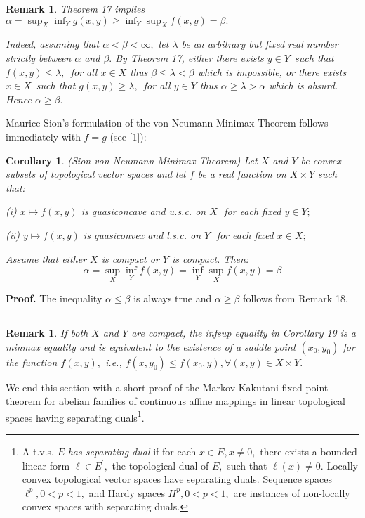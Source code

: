 \documentclass{article}
\newtheorem{corollary}[theorem]{Corollary}
\newtheorem{remark}[theorem]{Remark}
\newenvironment{proof}[1][Proof]{\noindent\textbf{#1.} }{\ \rule{0.5em}{0.5em}}
\begin{document}
\begin{remark}
Theorem 17 implies $\alpha =\sup_{X}\inf_{Y}g(x,y)\geq
\inf_{Y}\sup_{X}f(x,y)=\beta .$

Indeed, assuming that $\alpha <\beta <\infty ,$ let $\lambda $ be an
arbitrary but fixed real number strictly between $\alpha $ and $\beta .$ By
Theorem 17, either there exists $\bar{y}\in Y$\ such that $f(x,\bar{y})\leq
\lambda ,$\ for all $x\in X$ thus $\beta \leq \lambda <\beta $ which is
impossible, or there exists $\bar{x}\in X$\ such that $g(\bar{x},y)\geq
\lambda ,$\ for all $y\in Y$ thus $\alpha \geq \lambda >\alpha $ which is
absurd. Hence $\alpha \geq \beta .$
\end{remark}

Maurice Sion's formulation of the von Neumann Minimax Theorem follows
immediately with $f=g$ (see [1]):

\begin{corollary}
(Sion-von Neumann Minimax Theorem) Let $X$ and $Y$ be convex subsets of
topological vector spaces and let $f$ be a real function on $X\times Y$ such
that:

(i) $x\mapsto f(x,y)$ is quasiconcave and u.s.c. on $X\,$\ for each fixed $%
y\in Y;$

(ii) $y\mapsto f(x,y)$ is quasiconvex and l.s.c. on $Y\,$\ for each fixed $%
x\in X;$

Assume that either $X$ is compact or $Y$ is compact. Then:%
\begin{equation*}
\alpha =\sup_{X}\inf_{Y}f(x,y)=\inf_{Y}\sup_{X}f(x,y)=\beta
\end{equation*}
\end{corollary}

\begin{proof}
The inequality $\alpha \leq \beta $ is always true and $\alpha \geq \beta $
follows from Remark 18.
\end{proof}

\begin{remark}
If both $X$ and $Y$ are compact, the infsup equality in Corollary 19 is a
minmax equality and is equivalent to the existence of a saddle point $%
(x_{0},y_{0})$ for the function $f(x,y),$ i.e., $f(x,y_{0})\leq
f(x_{0},y),\forall (x,y)\in X\times Y.$
\end{remark}

We end this section with a short proof of the Markov-Kakutani fixed point
theorem for abelian families of continuous affine mappings in linear
topological spaces having separating duals\footnote{%
A t.v.s. $E$ \textit{has separating dual} if for each $x\in E,x\neq 0,$
there exists a bounded linear form $\ell \in E^{\prime },$ the topological
dual of $E,$ such that $\ell (x)\neq 0.$ Locally convex topological vector
spaces have separating duals. Sequence spaces $\ell ^{p},0<p<1,$ and Hardy
spaces $H^{p},0<p<1,$ are instances of non-locally convex spaces with
separating duals.}.
\end{document}
